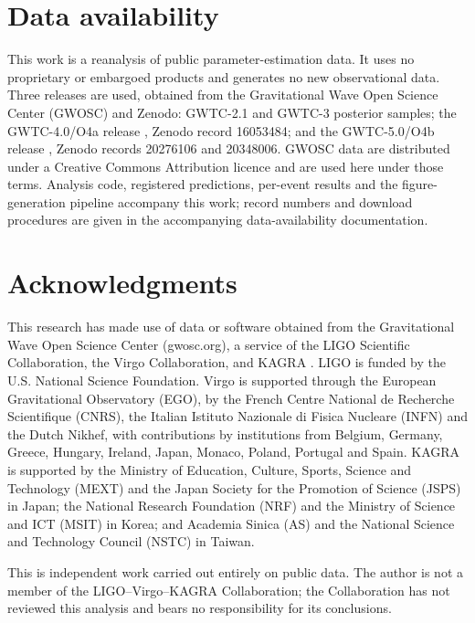 \documentclass[aps,preprint,amsmath,amssymb,nofootinbib,superscriptaddress]{revtex4-2}
\begin{document}
\section*{Data availability}
This work is a reanalysis of public parameter-estimation data. It uses no proprietary or embargoed
products and generates no new observational data. Three releases are used, obtained from the Gravitational
Wave Open Science Center (GWOSC) \citep{GWOSCthree} and Zenodo: GWTC-2.1 \citep{GWTC21} and GWTC-3
\citep{GWTC3} posterior samples; the GWTC-4.0/O4a release \citep{GWTC4}, Zenodo record 16053484; and the
GWTC-5.0/O4b release \citep{GWTC5}, Zenodo records 20276106 and 20348006. GWOSC data are distributed under
a Creative Commons Attribution licence and are used here under those terms. Analysis code, registered
predictions, per-event results and the figure-generation pipeline accompany this work; record numbers and
download procedures are given in the accompanying data-availability documentation.

\section*{Acknowledgments}
This research has made use of data or software obtained from the
Gravitational Wave Open Science Center (gwosc.org), a service of the LIGO Scientific Collaboration, the
Virgo Collaboration, and KAGRA
\citep{GWOSCthree,GWOSCfourA,GWOSCfourB}. LIGO is funded by the U.S. National Science Foundation. Virgo is
supported through the European Gravitational Observatory (EGO), by the French Centre National de Recherche
Scientifique (CNRS), the Italian Istituto Nazionale di Fisica Nucleare (INFN) and the Dutch Nikhef, with
contributions by institutions from Belgium, Germany, Greece, Hungary, Ireland, Japan, Monaco, Poland,
Portugal and Spain. KAGRA is supported by the Ministry of Education, Culture, Sports, Science and
Technology (MEXT) and the Japan Society for the Promotion of Science (JSPS) in Japan; the National Research
Foundation (NRF) and the Ministry of Science and ICT (MSIT) in Korea; and Academia Sinica (AS) and the
National Science and Technology Council (NSTC) in Taiwan.

This is independent work carried out entirely on public data. The author is not a member of the
LIGO--Virgo--KAGRA Collaboration; the Collaboration has not reviewed this
analysis and bears no responsibility for its conclusions.
\end{document}
